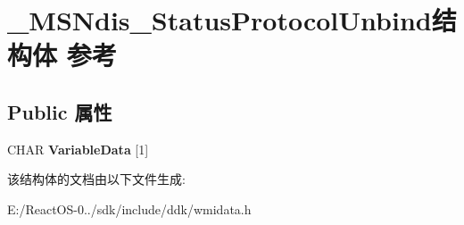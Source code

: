 \hypertarget{struct___m_s_ndis___status_protocol_unbind}{}\section{\+\_\+\+M\+S\+Ndis\+\_\+\+Status\+Protocol\+Unbind结构体 参考}
\label{struct___m_s_ndis___status_protocol_unbind}
\subsection*{Public 属性}
\begin{DoxyCompactItemize}
\item 
\mbox{\label{struct___m_s_ndis___status_protocol_unbind_ac3e704a636d969b4b6c5b2c37b418b7e}} 
C\+H\+AR {\bfseries Variable\+Data} \mbox{[}1\mbox{]}
\end{DoxyCompactItemize}


该结构体的文档由以下文件生成\+:\begin{DoxyCompactItemize}
\item 
E\+:/\+React\+O\+S-\/0../sdk/include/ddk/wmidata.\+h\end{DoxyCompactItemize}
